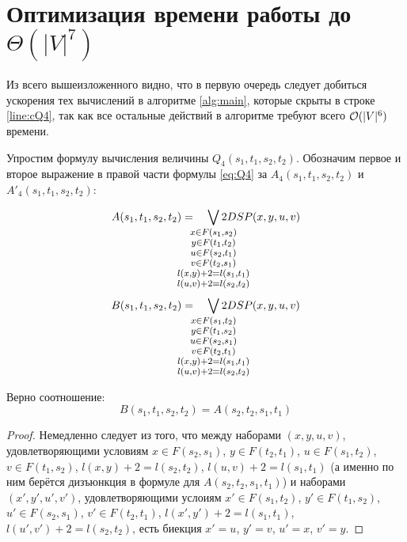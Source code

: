 \chapter{Оптимизация времени работы до $\Theta(|V|^7)$}

Из всего вышеизложенного видно, что в первую очередь следует добиться ускорения тех вычислений в алгоритме \ref{alg:main}, которые скрыты в строке \ref{line:cQ4}, так как все остальные действий в алгоритме требуют всего $\mathcal{O}(|V|^6)$ времени.

Упростим формулу вычисления величины $Q_4(s_1, t_1, s_2, t_2)$. Обозначим первое и второе выражение в правой части формулы \eqref{eq:Q4} за $A_4(s_1, t_1, s_2, t_2)$ и $A'_4(s_1, t_1, s_2, t_2)$:

\begin{equation} \label{eq:A} 
    A(s_1, t_1, s_2, t_2) = \quad
        \smashoperator{\bigvee_{
        \large \substack{
            x \in F(s_1, s_2)\\ 
            y \in F(t_1, t_2)\\ 
            u \in F(s_2, t_1)\\ 
            v \in F(t_2, s_1)\\ 
            l(x, y) + 2 = l(s_1, t_1)\\ 
            l(u, v) + 2 = l(s_2, t_2)
        }
        }} 2DSP(x, y, u, v)
\end{equation}
\begin{equation} \label{eq:B}
   B(s_1, t_1, s_2, t_2) = \quad
        \smashoperator{\bigvee_{
        \large \substack{
            x \in F(s_1, t_2)\\ 
            y \in F(t_1, s_2)\\ 
            u \in F(s_2, s_1)\\ 
            v \in F(t_2, t_1)\\ 
            l(x, y) + 2 = l(s_1, t_1)\\ 
            l(u, v) + 2 = l(s_2, t_2)
        }
        }} 2DSP(x, y, u, v)
\end{equation}
\begin{proposition}
Верно соотношение:
\begin{equation}
    B(s_1, t_1, s_2, t_2) = A(s_2, t_2, s_1, t_1)
\end{equation}
\end{proposition}
\begin{proof}
Немедленно следует из того, что между наборами $(x, y, u, v)$, удовлетворяющими условиям $x \in F(s_2, s_1)$, $y \in F(t_2, t_1)$, $u \in F(s_1, t_2)$, $v \in F(t_1, s_2)$, $l(x, y) + 2 = l(s_2, t_2)$, $l(u, v) + 2 = l(s_1, t_1)$ (а именно по ним берётся дизъюнкция в формуле для $A(s_2, t_2, s_1, t_1)$) и наборами $(x', y', u', v')$, удовлетворяющими услоиям $x' \in F(s_1, t_2)$, $y' \in F(t_1, s_2)$, $u' \in F(s_2, s_1)$, $v' \in F(t_2, t_1)$, $l(x', y') + 2 = l(s_1, t_1)$, $l(u', v') + 2 = l(s_2, t_2)$, есть биекция $x' = u$, $y' = v$, $u' = x$, $v' = y$.
\end{proof}

